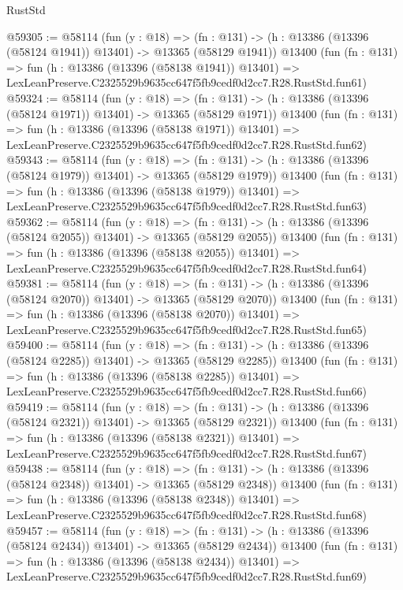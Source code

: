 \begin{lexlean}{RustStd}
\begin{coremodule}
@59305 := @58114
    (fun (y : @18) =>
    (fn : @131) -> (h : @13386 (@13396 (@58124 @1941)) @13401) -> @13365 (@58129 @1941))
    @13400
    (fun (fn : @131) =>
    fun (h : @13386 (@13396 (@58138 @1941)) @13401) =>
    LexLeanPreserve.C2325529b9635cc647f5fb9cedf0d2cc7.R28.RustStd.fun61)
@59324 := @58114
    (fun (y : @18) =>
    (fn : @131) -> (h : @13386 (@13396 (@58124 @1971)) @13401) -> @13365 (@58129 @1971))
    @13400
    (fun (fn : @131) =>
    fun (h : @13386 (@13396 (@58138 @1971)) @13401) =>
    LexLeanPreserve.C2325529b9635cc647f5fb9cedf0d2cc7.R28.RustStd.fun62)
@59343 := @58114
    (fun (y : @18) =>
    (fn : @131) -> (h : @13386 (@13396 (@58124 @1979)) @13401) -> @13365 (@58129 @1979))
    @13400
    (fun (fn : @131) =>
    fun (h : @13386 (@13396 (@58138 @1979)) @13401) =>
    LexLeanPreserve.C2325529b9635cc647f5fb9cedf0d2cc7.R28.RustStd.fun63)
@59362 := @58114
    (fun (y : @18) =>
    (fn : @131) -> (h : @13386 (@13396 (@58124 @2055)) @13401) -> @13365 (@58129 @2055))
    @13400
    (fun (fn : @131) =>
    fun (h : @13386 (@13396 (@58138 @2055)) @13401) =>
    LexLeanPreserve.C2325529b9635cc647f5fb9cedf0d2cc7.R28.RustStd.fun64)
@59381 := @58114
    (fun (y : @18) =>
    (fn : @131) -> (h : @13386 (@13396 (@58124 @2070)) @13401) -> @13365 (@58129 @2070))
    @13400
    (fun (fn : @131) =>
    fun (h : @13386 (@13396 (@58138 @2070)) @13401) =>
    LexLeanPreserve.C2325529b9635cc647f5fb9cedf0d2cc7.R28.RustStd.fun65)
@59400 := @58114
    (fun (y : @18) =>
    (fn : @131) -> (h : @13386 (@13396 (@58124 @2285)) @13401) -> @13365 (@58129 @2285))
    @13400
    (fun (fn : @131) =>
    fun (h : @13386 (@13396 (@58138 @2285)) @13401) =>
    LexLeanPreserve.C2325529b9635cc647f5fb9cedf0d2cc7.R28.RustStd.fun66)
@59419 := @58114
    (fun (y : @18) =>
    (fn : @131) -> (h : @13386 (@13396 (@58124 @2321)) @13401) -> @13365 (@58129 @2321))
    @13400
    (fun (fn : @131) =>
    fun (h : @13386 (@13396 (@58138 @2321)) @13401) =>
    LexLeanPreserve.C2325529b9635cc647f5fb9cedf0d2cc7.R28.RustStd.fun67)
@59438 := @58114
    (fun (y : @18) =>
    (fn : @131) -> (h : @13386 (@13396 (@58124 @2348)) @13401) -> @13365 (@58129 @2348))
    @13400
    (fun (fn : @131) =>
    fun (h : @13386 (@13396 (@58138 @2348)) @13401) =>
    LexLeanPreserve.C2325529b9635cc647f5fb9cedf0d2cc7.R28.RustStd.fun68)
@59457 := @58114
    (fun (y : @18) =>
    (fn : @131) -> (h : @13386 (@13396 (@58124 @2434)) @13401) -> @13365 (@58129 @2434))
    @13400
    (fun (fn : @131) =>
    fun (h : @13386 (@13396 (@58138 @2434)) @13401) =>
    LexLeanPreserve.C2325529b9635cc647f5fb9cedf0d2cc7.R28.RustStd.fun69)

\end{coremodule}
\end{lexlean}
